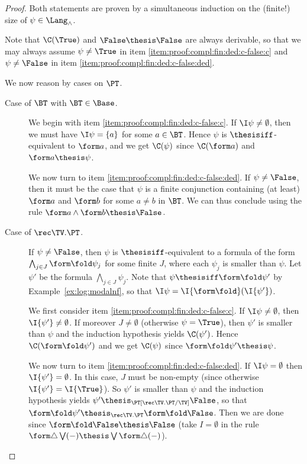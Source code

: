 \begin{proof}
Both statements are proven by a simultaneous induction on the (finite!)
size of $\psi \in \Lang_\land$.

Note that $\C(\True)$ and $\False \thesis \False$
are always derivable,
so that we may always assume $\psi \neq \True$ in
item \eqref{item:proof:compl:fin:ded:c-false:c}
and $\psi \neq \False$ in
item \eqref{item:proof:compl:fin:ded:c-false:ded}.

We now reason by cases on $\PT$.
\begin{description}
\item[Case of $\BT$ with $\BT \in \Base$.]
We begin with item \eqref{item:proof:compl:fin:ded:c-false:c}.
If $\I\psi \neq \emptyset$,
then we must have $\I\psi = \{a\}$ for some $a \in \BT$.
Hence $\psi$ is $\thesisiff$-equivalent to $\form a$,
and we get $\C(\psi)$ since $\C(\form a)$ and $\form a \thesis \psi$.

We now turn to item \eqref{item:proof:compl:fin:ded:c-false:ded}.
If $\psi \neq \False$, then it must be the case that
$\psi$ is a finite conjunction containing (at least)
$\form a$ and $\form b$ for some $a \neq b$ in $\BT$.
We can thus conclude using the rule $\form a \land \form b \thesis \False$.

\item[Case of $\rec\TV.\PT$.]
If $\psi \neq \False$,
then $\psi$ is $\thesisiff$-equivalent to a formula of the form
$\bigwedge_{j \in J}\form\fold \psi_j$ for some finite $J$,
where each $\psi_j$ is smaller than $\psi$.
Let $\psi'$ be the formula
$\bigwedge_{j \in J} \psi_j$.
Note that $\psi \thesisiff \form\fold\psi'$ by Example~\ref{ex:log:modalnf},
so that
$\I\psi = \I{\form\fold}(\I{\psi'})$.

We first consider item \eqref{item:proof:compl:fin:ded:c-false:c}.
If $\I\psi \neq \emptyset$,
then $\I{\psi'} \neq \emptyset$.
If moreover $J \neq \emptyset$ (otherwise $\psi = \True$),
then
$\psi'$ is smaller than $\psi$ and the induction hypothesis
yields $\C(\psi')$.
Hence $\C(\form\fold \psi')$
and we get $\C(\psi)$ since $\form\fold \psi' \thesis \psi$.

We now turn to item \eqref{item:proof:compl:fin:ded:c-false:ded}.
If $\I\psi = \emptyset$ then
$\I{\psi'} = \emptyset$.
In this case, $J$ must be non-empty
(since otherwise $\I{\psi'} = \I{\True}$).
So $\psi'$ is smaller than $\psi$
and the induction hypothesis yields
$\psi' \thesis_{\PT[\rec\TV.\PT/\TV]} \False$,
so that
$\form\fold\psi' \thesis_{\rec\TV.\PT} \form\fold \False$.
Then we are done since $\form\fold \False \thesis \False$
(take $I = \emptyset$ in the rule
$\form\triangle \bigvee (-) \thesis \bigvee \form\triangle(-)$).


\end{description}
\end{proof}
